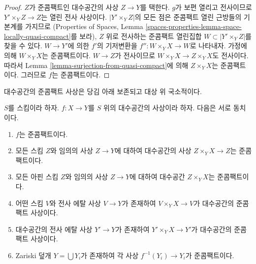 \begin{proof}
$Z$가 준콤팩트인 대수공간의 사상 $Z \to Y$를 택한다.
$g$가 보편 열리고 전사이므로
$Y' \times_Y Z \to Z$는 열린 전사 사상이다.
$|Y' \times_Y Z|$의 모든 점은 준콤팩트 열린 근방들의 기본계를 가지므로
(Properties of Spaces, Lemma
\ref{spaces-properties-lemma-space-locally-quasi-compact}를 보라),
$Z$ 위로 전사하는 준콤팩트 열린집합
$W \subset |Y' \times_Y Z|$를 찾을 수 있다.
$W \to Y'$에 의한 $f'$의 기저변환을
$f'' : W \times_Y X \to W$로 나타내자.
가정에 의해 $W \times_Y X$는 준콤팩트이다.
$W \to Z$가 전사이므로 $W \times_Y X \to Z \times_Y X$도 전사이다.
따라서 Lemma \ref{lemma-surjection-from-quasi-compact}에 의해
$Z \times_Y X$는 준콤팩트이다. 그러므로 $f$는 준콤팩트이다.
\end{proof}

\begin{lemma}
\label{lemma-quasi-compact-local}
\begin{slogan}
대수공간의 준콤팩트 사상은 당김 아래 보존되고 대상 위 국소적이다.
\end{slogan}
$S$를 스킴이라 하자.
$f : X \to Y$를 $S$ 위의 대수공간의 사상이라 하자.
다음은 서로 동치이다.
\begin{enumerate}
\item $f$는 준콤팩트이다.
\item 모든 스킴 $Z$와 임의의 사상 $Z \to Y$에 대하여
대수공간의 사상 $Z \times_Y X \to Z$는 준콤팩트이다.
\item 모든 아핀 스킴 $Z$와 임의의 사상 $Z \to Y$에 대하여
대수공간 $Z \times_Y X$는 준콤팩트이다.
\item 어떤 스킴 $V$와 전사 에탈 사상 $V \to Y$가 존재하여
$V \times_Y X \to V$가 대수공간의 준콤팩트 사상이다.
\item 대수공간의 전사 에탈 사상 $Y' \to Y$가 존재하여
$Y' \times_Y X \to Y'$가 대수공간의 준콤팩트 사상이다.
\item Zariski 덮개 $Y = \bigcup Y_i$가 존재하여 각 사상
$f^{-1}(Y_i) \to Y_i$가 준콤팩트이다.
\end{enumerate}
\end{lemma}

